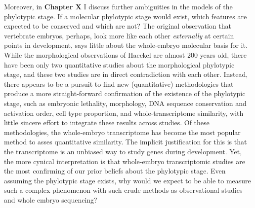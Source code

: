Moreover, in \textbf{Chapter X} I discuss further ambiguities in the models of the phylotypic stage. If a molecular phylotypic stage would exist, which features are expected to be conserved and which are not? The original observation that vertebrate embryos, perhaps, look more like each other \textit{externally} at certain points in development, says little about the whole-embryo molecular basis for it. While the morphological observations of Haeckel are almost 200 years old, there have been only two quantitative studies about the morphological phylotypic stage, and these two studies are in direct contradiction with each other. Instead, there appears to be a pursuit to find new (quantitative) methodologies that produce a more straight-forward confirmation of the existence of the phylotypic stage, such as embryonic lethality\cite{Uchida2018}, morphology\cite{OlafRP2003,Cordero2020}, DNA sequence conservation\cite{Piasecka2013,Quint2012,Liu2021} and activation order\cite{Uesaka2019}, cell type proportion\cite{Mayshar2023}, and whole-transcriptome similarity\cite{Piasecka2013,Irie2011,marletaz2018,Liu2020,Leong2021,PerezPosada2022,Kalinka2010}, with little sincere effort to integrate these results across studies. Of these methodologies, the whole-embryo transcriptome has become the most popular method to asses quantitative similarity. The implicit justification for this is that the transcriptome is an unbiased way to study genes during development. Yet, the more cynical interpretation is that whole-embryo transcriptomic studies are the most confirming of our prior beliefs about the phylotypic stage. Even assuming the phylotypic stage exists, why would we expect to be able to measure such a complex phenomenon with such crude methods as observational studies and whole embryo sequencing? 

